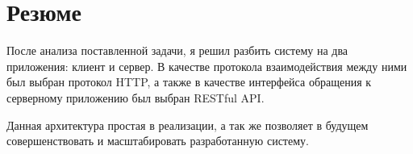 
\section{Резюме} \label{ch1:conclusion}

После анализа поставленной задачи, я решил разбить систему на два приложения: клиент и сервер. В качестве протокола взаимодействия между ними был выбран протокол HTTP, а также в качестве интерфейса обращения к серверному приложению был выбран RESTful API. 

Данная архитектура простая в реализации, а так же позволяет в будущем совершенствовать и масштабировать разработанную систему.
 
\newpage



%
